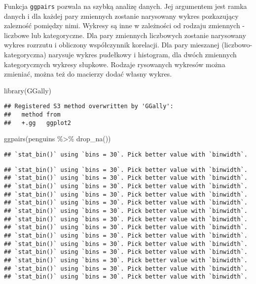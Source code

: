 \documentclass[
]{book}
\newenvironment{Shaded}{\begin{snugshade}}{\end{snugshade}}
\newcommand{\FunctionTok}[1]{\textcolor[rgb]{0.00,0.00,0.00}{#1}}
\newcommand{\NormalTok}[1]{#1}
\newcommand{\SpecialCharTok}[1]{\textcolor[rgb]{0.00,0.00,0.00}{#1}}
\begin{document}
Funkcja \texttt{ggpairs} pozwala na szybką analizę danych. Jej argumentem jest ramka danych i dla każdej pary zmiennych zostanie narysowany wykres pozkazujący zalezność pomiędzy nimi. Wykresy są inne w zależności od rodzaju zmiennych - liczbowe lub kategoryczne. Dla pary zmiennych liczbowych zostanie narysowany wykres rozrzutu i obliczony współczynnik korelacji. Dla pary mieszanej (liczbowo-kategoryczna) narysuje wykres pudełkowy i histogram, dla dwóch zmiennych kategorycznych wykresy słupkowe. Rodzaje rysowanych wykresów można zmieniać, można też do macierzy dodać własny wykres.

\begin{Shaded}
\begin{Highlighting}[]
\FunctionTok{library}\NormalTok{(GGally)}
\end{Highlighting}
\end{Shaded}

\begin{verbatim}
## Registered S3 method overwritten by 'GGally':
##   method from   
##   +.gg   ggplot2
\end{verbatim}

\begin{Shaded}
\begin{Highlighting}[]
\FunctionTok{ggpairs}\NormalTok{(penguins }\SpecialCharTok{\%\textgreater{}\%} \FunctionTok{drop\_na}\NormalTok{())}
\end{Highlighting}
\end{Shaded}

\begin{verbatim}
## `stat_bin()` using `bins = 30`. Pick better value with `binwidth`.
\end{verbatim}

\begin{verbatim}
## `stat_bin()` using `bins = 30`. Pick better value with `binwidth`.
## `stat_bin()` using `bins = 30`. Pick better value with `binwidth`.
## `stat_bin()` using `bins = 30`. Pick better value with `binwidth`.
## `stat_bin()` using `bins = 30`. Pick better value with `binwidth`.
## `stat_bin()` using `bins = 30`. Pick better value with `binwidth`.
## `stat_bin()` using `bins = 30`. Pick better value with `binwidth`.
## `stat_bin()` using `bins = 30`. Pick better value with `binwidth`.
## `stat_bin()` using `bins = 30`. Pick better value with `binwidth`.
## `stat_bin()` using `bins = 30`. Pick better value with `binwidth`.
## `stat_bin()` using `bins = 30`. Pick better value with `binwidth`.
## `stat_bin()` using `bins = 30`. Pick better value with `binwidth`.
## `stat_bin()` using `bins = 30`. Pick better value with `binwidth`.
## `stat_bin()` using `bins = 30`. Pick better value with `binwidth`.
## `stat_bin()` using `bins = 30`. Pick better value with `binwidth`.
\end{verbatim}
\end{document}

